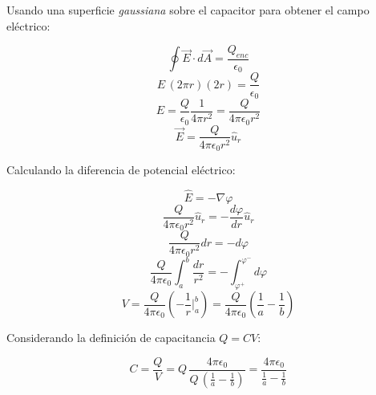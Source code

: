 \documentclass[letter,11pt]{article}
\begin{document}
Usando una superficie \emph{gaussiana} sobre el capacitor para obtener el campo
eléctrico:

\begin{equation*}
    \oint\vec{E}\cdot d\vec{A}=\frac{Q_{enc}}{\epsilon_0}
\end{equation*}
\begin{equation*}
    E\,(2\pi r)(2r)=\frac{Q}{\epsilon_0}
\end{equation*}
\begin{equation*}
    E=\frac{Q}{\epsilon_0}\frac{1}{4\pi r^2}
     =\frac{Q}{4\pi\epsilon_0 r^2}
\end{equation*}
\begin{equation*}
    \vec{E}=\frac{Q}{4\pi\epsilon_0 r^2}\hat{u}_r
\end{equation*}
\vspace{0.5cm}

Calculando la diferencia de potencial eléctrico:

\begin{equation*}
    \hat{E}=-\nabla\varphi
\end{equation*}
\begin{equation*}
    \frac{Q}{4\pi\epsilon_0 r^2}\hat{u}_r=-\frac{d\varphi}{dr}\hat{u}_r
\end{equation*}
\begin{equation*}
    \frac{Q}{4\pi\epsilon_0 r^2}dr=-d\varphi
\end{equation*}
\begin{equation*}
    \frac{Q}{4\pi\epsilon_0}\int_a^b\frac{dr}{r^2}
    =-\int_{\varphi^+}^{\varphi^-}d\varphi
\end{equation*}
\begin{equation*}
    V=\frac{Q}{4\pi\epsilon_0}(-\frac{1}{r}\Biggr|_a^b)
     =\frac{Q}{4\pi\epsilon_0}\left(\frac{1}{a}-\frac{1}{b}\right)
\end{equation*}
\vspace{0.5cm}

Considerando la definición de capacitancia $Q=CV$:

\begin{equation*}
    C=\frac{Q}{V}
     =Q\,\frac{4\pi\epsilon_0}{Q\,\left(\frac{1}{a}-\frac{1}{b}\right)}
     =\frac{4\pi\epsilon_0}{\frac{1}{a}-\frac{1}{b}}
\end{equation*}
\end{document}
